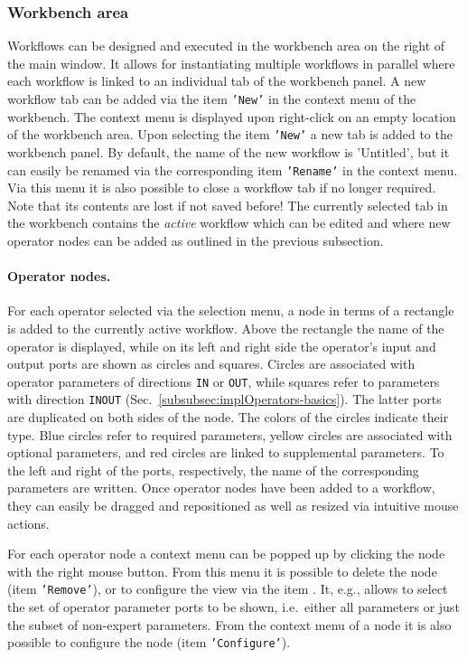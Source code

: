 \subsubsection{Workbench area} 
Workflows can be designed and executed in the workbench area on the right of the main window. It allows for instantiating
multiple workflows in parallel where each workflow is linked to an individual tab of the workbench panel. 
A new workflow tab can be added via the item {\tt 'New'} in the context menu of the workbench. 
The context menu is displayed upon right-click on an empty location of the workbench area. 
Upon selecting the item {\tt 'New'} a new tab is added to the workbench panel.
By default, the name of the new workflow is 'Untitled', but it can easily be
renamed via the corresponding item {\tt 'Rename'} in the context menu. Via this
menu it is also possible to close a workflow tab if no longer required. Note
that its contents are lost if not saved before! The currently selected tab in
the workbench contains the {\em active} workflow which can be edited and where
new operator nodes can be added as outlined in the previous subsection.

\paragraph{Operator nodes.} For each operator selected via the selection menu, a
node in terms of a rectangle is added to the currently active workflow. Above the rectangle 
the name of the operator is displayed, while on its left and right side the operator's input and output ports are shown as circles and 
squares. Circles are associated with operator parameters of directions {\tt IN} or {\tt OUT}, while squares refer to parameters with
direction {\tt INOUT} (Sec.~\ref{subsubsec:implOperators-basics}). The latter ports are duplicated on both sides of the node.
The colors of the circles indicate their type. Blue circles refer to required parameters, yellow circles are associated with optional 
parameters, and red circles are linked to supplemental parameters. To the left and right of the ports,
respectively, the name of the corresponding parameters are written.  
Once operator nodes have been added to a workflow, they can easily be dragged
and repositioned as well as resized via intuitive mouse actions. 

For each operator node a context menu can be popped up by clicking the node with the right mouse
button. From this menu it is possible to delete the node (item {\tt 'Remove'}), or to configure the
view via the item . It, e.g., allows to select the set of operator parameter ports
to be shown, i.e.~either all parameters or just the subset of non-expert parameters. From the
context menu of a node it is also possible to configure the node (item {\tt 'Configure'}).  
